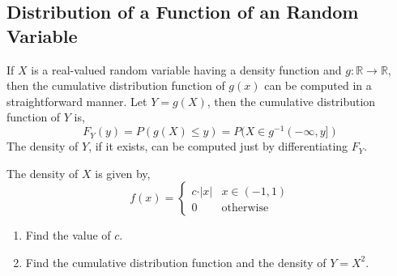 \subsection{Distribution of a Function of an Random Variable}
If $X$ is a real-valued random variable having a density function and $g :
\mathbb{R} \rightarrow \mathbb{R}$, then the cumulative distribution function
of $g(x)$ can be computed in a straightforward manner. Let $Y = g(X)$, then the
cumulative distribution function of $Y$ is, 
\[
    F_Y(y) = P(g(X) \leq y) 
           = P(X \in g^{-1}(-\infty, y])
\]
The density of $Y$, if it exists, can be computed just by differentiating
$F_Y$.

\begin{example}
The density of $X$ is given by,
\[
    f(x) = \begin{cases}
        c \cdot \vert x \vert       & x \in (-1, 1)                          \\
        0                           & \text{otherwise}
    \end{cases}
\]
\begin{enumerate}[noitemsep, topsep=0em]
\item Find the value of $c$.
\item Find the cumulative distribution function and the density of $Y = X^2$.
\end{enumerate}
\end{example}
